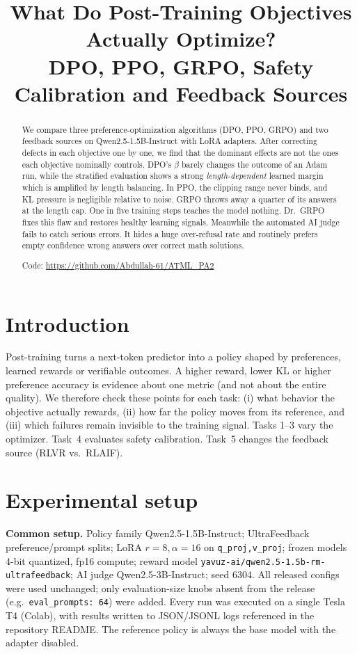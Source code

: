 \documentclass{article}
\title{What Do Post-Training Objectives Actually Optimize?\\ DPO, PPO, GRPO, Safety Calibration and Feedback Sources}
\author{} %
\begin{document}
\maketitle

\begin{abstract}
We compare three preference-optimization algorithms (DPO, PPO, GRPO) and two feedback sources on Qwen2.5-1.5B-Instruct with LoRA adapters. After correcting defects in each objective one by one, we find that the dominant effects are not the ones each objective nominally controls. DPO's $\beta$ barely changes the outcome of an Adam run, while the stratified evaluation shows a strong \emph{length-dependent} learned margin which is amplified by length balancing. In PPO, the clipping range never binds, and KL pressure is negligible relative to noise. GRPO throws away a quarter of its answers at the length cap. One in five training steps teaches the model nothing. Dr.~GRPO fixes this flaw and restores healthy learning signals. Meanwhile the automated AI judge fails to catch serious errors. It hides a huge over-refusal rate and routinely prefers empty confidence wrong answers over correct math solutions.

Code: \url{https://github.com/Abdullah-61/ATML_PA2}
\end{abstract}

\section{Introduction}
Post-training turns a next-token predictor into a policy shaped by preferences, learned rewards or verifiable outcomes. A higher reward, lower KL or higher preference accuracy is evidence about one metric (and not about the entire quality). We therefore check these points for each task: (i) what behavior the objective actually rewards, (ii) how far the policy moves from its reference, and (iii) which failures remain invisible to the training signal. Tasks 1--3 vary the optimizer. Task~4 evaluates safety calibration. Task~5 changes the feedback source (RLVR vs.\ RLAIF).

\section{Experimental setup}
\label{sec:setup}
\textbf{Common setup.} Policy family Qwen2.5-1.5B-Instruct; UltraFeedback~\cite{cui2024ultrafeedback} preference/prompt splits; LoRA $r{=}8,\alpha{=}16$ on \texttt{q\_proj,v\_proj}; frozen models 4-bit quantized, fp16 compute; reward model \texttt{yavuz-ai/qwen2.5-1.5b-rm-ultrafeedback}; AI judge Qwen2.5-3B-Instruct; seed 6304. All released configs were used unchanged; only evaluation-size knobs absent from the release (e.g.\ \texttt{eval\_prompts: 64}) were added. Every run was executed on a single Tesla T4 (Colab), with results written to JSON/JSONL logs referenced in the repository README. The reference policy is always the base model with the adapter disabled.
\end{document}
